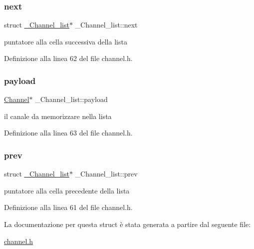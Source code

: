 \subsubsection{\texorpdfstring{next}{next}}
{\footnotesize\ttfamily struct \hyperlink{struct__Channel__list}{\+\_\+\+Channel\+\_\+list}$\ast$ \+\_\+\+Channel\+\_\+list\+::next}



puntatore alla cella successiva della lista 



Definizione alla linea 62 del file channel.\+h.

\mbox{\label{struct__Channel__list_a0f42a32ae0c0b003e8802f2130d9dff9}} 
\subsubsection{\texorpdfstring{payload}{payload}}
{\footnotesize\ttfamily \hyperlink{structChannel}{Channel}$\ast$ \+\_\+\+Channel\+\_\+list\+::payload}



il canale da memorizzare nella lista 



Definizione alla linea 63 del file channel.\+h.

\mbox{\label{struct__Channel__list_a7fc520dc8ea525f40d9b21d73d775c40}} 
\subsubsection{\texorpdfstring{prev}{prev}}
{\footnotesize\ttfamily struct \hyperlink{struct__Channel__list}{\+\_\+\+Channel\+\_\+list}$\ast$ \+\_\+\+Channel\+\_\+list\+::prev}



puntatore alla cella precedente della lista 



Definizione alla linea 61 del file channel.\+h.



La documentazione per questa struct è stata generata a partire dal seguente file\+:\begin{DoxyCompactItemize}
\item 
\hyperlink{channel_8h}{channel.\+h}\end{DoxyCompactItemize}
